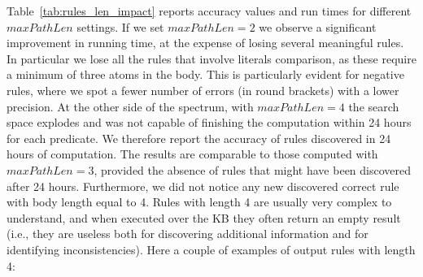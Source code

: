 Table~\ref{tab:rules_len_impact} reports accuracy values and run times for different $maxPathLen$ settings. If we set $maxPathLen=2$ we observe a significant improvement in running time, at the expense of losing several meaningful rules. In particular we lose all the rules that involve literals comparison, as these require a minimum of three atoms in the body. This is particularly evident for negative rules, where we spot a fewer number of errors (in round brackets) with a lower precision. At the other side of the spectrum, with $maxPathLen=4$ the search space explodes and \krd was not capable of finishing the computation within 24 hours for each predicate. We therefore report the accuracy of rules discovered in 24 hours of computation. The results are comparable to those computed with $maxPathLen=3$, provided the absence of rules that might have been discovered after 24 hours. Furthermore, we did not notice any new discovered correct rule with body length equal to 4. Rules with length 4 are usually very complex to understand, and when executed over the KB they often return an empty result (i.e., they are useless both for discovering additional information and for identifying inconsistencies). Here a couple of examples of output rules with length 4:

